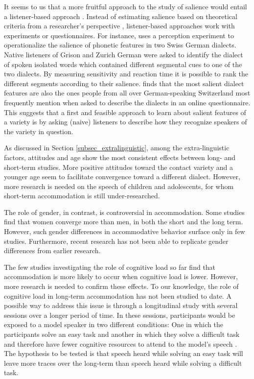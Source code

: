 \documentclass[output=paper]{langscibook}
\begin{document}
It seems to us that a more fruitful approach to the study of salience would entail a listener-based approach \citep{macleod_critical_2015,ruch_role_2018}. Instead of estimating salience based on theoretical criteria from a researcher's perspective \citep{auer_subjective_1998,trudgill_dialects_1986}, listener-based approaches work with experiments or questionnaires. For instance, \textcite{ruch_role_2018} uses a perception experiment to operationalize the salience of phonetic features in two Swiss German dialects. Native listeners of Grison and Zurich German were asked to identify the dialect of spoken isolated words which contained different segmental cues to one of the two dialects. By measuring sensitivity and reaction time it is possible to rank the different segments according to their salience. \textcite{ruch_role_2018} finds that the most salient dialect features are also the ones people from all over German-speaking Switzerland most frequently mention when asked to describe the dialects in an online questionnaire. This suggests that a first and feasible approach to learn about salient features of a variety is by asking (naive) listeners to describe  how they recognize speakers of the variety in question.

As discussed in Section \ref{subsec_extralinguistic}, among the extra-linguistic factors, attitudes and age show the most consistent effects between long- and short-term studies. More positive attitudes toward the contact variety and a younger age seem to facilitate convergence toward a different dialect. However, more research is needed on the speech of children and adolescents, for whom short-term accommodation is still under-researched.

The role of gender, in contrast, is controversial in accommodation. Some studies find that women converge more than men, in both the short and the long term. However, such gender differences in accommodative behavior surface only in few studies. Furthermore, recent research has not been able to replicate gender differences from earlier research.

The few studies investigating the role of cognitive load so far find that accommodation is more likely to occur when cognitive load is lower. However, more research is needed to confirm these effects. To our knowledge, the role of cognitive load in long-term accommodation has not been studied to date. A possible way to address this issue is through a longitudinal study with several sessions over a longer period of time. In these sessions, participants would be exposed to a model speaker in two different conditions: One in which the participants solve an easy task and another in which they solve a difficult task and therefore have fewer cognitive resources to attend to the model's speech \citep[see][]{abel_effect_2015}. The hypothesis to be tested is that speech heard while solving an easy task will leave more traces over the long-term than speech heard while solving a difficult task.
\end{document}
